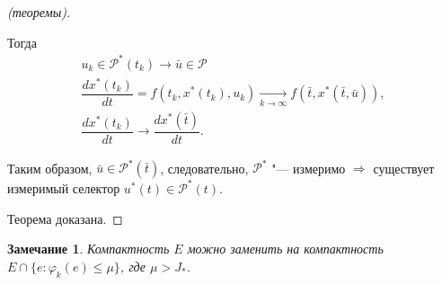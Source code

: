 \documentclass[12pt, a4paper]{article}
\theoremstyle{rusdef}
\newtheorem{remark}{Замечание}
\renewcommand{\P}{\mathscr{P}} %
\DeclareMathOperator*{\thus}{\Rightarrow} %
\DeclareMathOperator*{\To}{\longrightarrow}
\begin{document}
\begin{proof}[(теоремы)]
\begin{enumerate}
  Тогда
  \begin{gather*}
    u_k \in \P^*(t_k) \to \bar{u} \in \P \\
    \dfrac{dx^*(t_k)}{dt} = f(t_k, x^*(t_k), u_k) \To\limits_{k \to \infty} f(\bar{t}, x^*(\bar{t}, \bar{u})), \\
    \dfrac{dx^*(t_k)}{dt} \to \dfrac{dx^*(\bar{t})}{dt}.
  \end{gather*}

  Таким образом, $\bar{u} \in \P^*(\bar{t})$, следовательно, $\P^*$ "--- измеримо $\thus$ существует измеримый селектор $u^*(t) \in \P^*(t)$.
  \end{enumerate}
Теорема доказана.
\end{proof}
\begin{remark}
  Компактность $E$ можно заменить на компактность $E \cap \{ e \colon \varphi_k(e) \leqslant \mu \}$, где $\mu > J_*$.
\end{remark}
\end{document}
